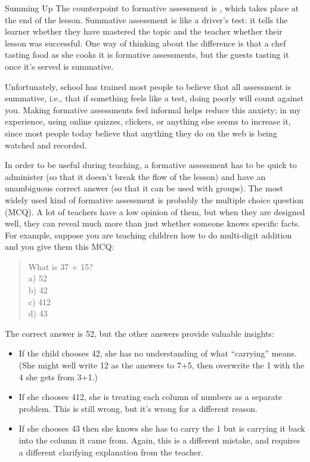 \begin{aside}{Summing Up}
  The counterpoint to formative assessment is
  ,
  which takes place at the end of the lesson.
  Summative assessment is like a driver's test:
  it tells the learner whether they have mastered the topic
  and the teacher whether their lesson was successful.
  One way of thinking about the difference is that
  a chef tasting food as she cooks it is formative assessments,
  but the guests tasting it once it's served is summative.

  Unfortunately,
  school has trained most people to believe that all assessment is summative,
  i.e.,
  that if something feels like a test,
  doing poorly will count against you.
  Making formative assessments feel informal helps reduce this anxiety;
  in my experience,
  using online quizzes, clickers, or anything else seems to increase it,
  since most people today believe that anything they do on the web is being watched and recorded.
\end{aside}
  
In order to be useful during teaching,
a formative assessment has to be quick to administer
(so that it doesn't break the flow of the lesson)
and have an unambiguous correct answer
(so that it can be used with groups).
The most widely used kind of formative assessment is probably
the multiple choice question (MCQ).
A lot of teachers have a low opinion of them,
but when they are designed well,
they can reveal much more than just whether someone knows specific facts.
For example,
suppose you are teaching children how to do multi-digit addition~\cite{Ojos2015}
and you give them this MCQ:

\begin{quote}
  What is 37 + 15?\\
  a) 52\\
  b) 42\\
  c) 412\\
  d) 43
\end{quote}

\noindent
The correct answer is 52,
but the other answers provide valuable insights:

\begin{itemize}

\item
  If the child chooses 42,
  she has no understanding of what ``carrying'' means.
  (She might well write 12 as the answers to 7+5,
  then overwrite the 1 with the 4 she gets from 3+1.)

\item
  If she chooses 412,
  she is treating each column of numbers as a separate problem.
  This is still wrong,
  but it's wrong for a different reason.

\item
  If she chooses 43 then she knows she has to carry the 1
  but is carrying it back into the column it came from.
  Again,
  this is a different mistake,
  and requires a different clarifying explanation from the teacher.

\end{itemize}

